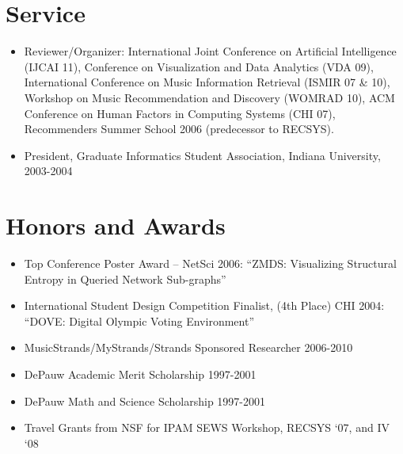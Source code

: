 \documentclass[overlapped,line,letterpaper]{res}
\begin{document}
\begin{resume}

% 


\section{\bf Service}

\begin{itemize}
\item Reviewer/Organizer: International Joint Conference on Artificial Intelligence (IJCAI 11), Conference on Visualization and Data Analytics (VDA 09), International Conference on Music Information Retrieval (ISMIR 07 \& 10), Workshop on Music Recommendation and Discovery (WOMRAD 10), ACM Conference on Human Factors in Computing Systems (CHI 07), Recommenders Summer School 2006 (predecessor to RECSYS). 
\item President, Graduate Informatics Student Association, Indiana University,
  2003-2004
\end{itemize}


\section{\bf Honors and Awards}
\begin{itemize}
	\item Top Conference Poster Award – NetSci 2006:
	“ZMDS: Visualizing Structural Entropy in Queried Network Sub-graphs”
	\item International Student Design Competition Finalist, (4th Place) CHI 2004:
	“DOVE: Digital Olympic Voting Environment”
	\item MusicStrands/MyStrands/Strands Sponsored Researcher 2006-2010 
	\item DePauw Academic Merit Scholarship 
	1997-2001
	\item DePauw Math and Science Scholarship 
	1997-2001
	\item Travel Grants from NSF for IPAM SEWS Workshop, RECSYS `07, and IV `08


\end{itemize}
\end{resume}
\end{document}
